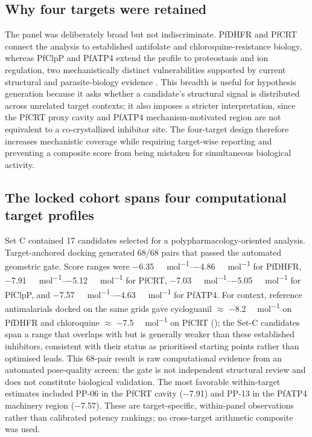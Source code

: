 \documentclass[journal=jcisd8,manuscript=article]{achemso}
\begin{document}
\subsection{Why four targets were retained}
The panel was deliberately broad but not indiscriminate. PfDHFR and PfCRT connect the analysis to established antifolate and chloroquine-resistance biology, whereas PfClpP and PfATP4 extend the profile to proteostasis and ion regulation, two mechanistically distinct vulnerabilities supported by current structural and parasite-biology evidence \cite{Tissawak2025,Haile2025}. This breadth is useful for hypothesis generation because it asks whether a candidate's structural signal is distributed across unrelated target contexts; it also imposes a stricter interpretation, since the PfCRT proxy cavity and PfATP4 mechanism-motivated region are not equivalent to a co-crystallized inhibitor site. The four-target design therefore increases mechanistic coverage while requiring target-wise reporting and preventing a composite score from being mistaken for simultaneous biological activity.

\subsection{The locked cohort spans four computational target profiles}
Set C contained 17 candidates selected for a polypharmacology-oriented analysis. Target-anchored docking generated \num{68}/\num{68} pairs that passed the automated geometric gate. Score ranges were \qtyrange{-6.35}{-4.86}{\kilo\calorie\per\mole} for PfDHFR, \qtyrange{-7.91}{-5.12}{\kilo\calorie\per\mole} for PfCRT, \qtyrange{-7.03}{-5.05}{\kilo\calorie\per\mole} for PfClpP, and \qtyrange{-7.57}{-4.63}{\kilo\calorie\per\mole} for PfATP4. For context, reference antimalarials docked on the same grids gave cycloguanil $\approx$ \num{-8.2} \si{\kilo\calorie\per\mole} on PfDHFR and chloroquine $\approx$ \num{-7.5} \si{\kilo\calorie\per\mole} on PfCRT (); the Set-C candidates span a range that overlaps with but is generally weaker than these established inhibitors, consistent with their status as prioritised starting points rather than optimised leads. This 68-pair result is raw computational evidence from an automated pose-quality screen; the gate is not independent structural review and does not constitute biological validation. The most favorable within-target estimates included PP-06 in the PfCRT cavity (\num{-7.91}) and PP-13 in the PfATP4 machinery region (\num{-7.57}). These are target-specific, within-panel observations rather than calibrated potency rankings; no cross-target arithmetic composite was used.
\end{document}
